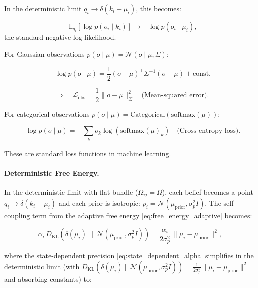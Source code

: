 \documentclass[twoside,11pt]{article}
\begin{document}
In the deterministic limit $q_i \to \delta(k_i - \mu_i)$, this becomes:

\begin{equation}
-\mathbb{E}_{q_i}[\log p(o_i \mid k_i)] \to -\log p(o_i \mid \mu_i),
\end{equation}
the standard negative log-likelihood.

For Gaussian observations $p(o \mid \mu) = \mathcal{N}(o \mid \mu, \Sigma)$:

\begin{equation}
-\log p(o \mid \mu) = \frac{1}{2}(o - \mu)^\top \Sigma^{-1} (o - \mu) + \text{const.}
\end{equation}

\begin{equation}
\implies \quad \mathcal{L}_{\text{obs}} = \frac{1}{2}\|o - \mu\|^2_{\Sigma} \quad \text{(Mean-squared error)}.
\end{equation}

For categorical observations $p(o \mid \mu) = \mathrm{Categorical}(\mathrm{softmax}(\mu))$:

\begin{equation}
-\log p(o \mid \mu) = -\sum_k o_k \log(\mathrm{softmax}(\mu)_k) \quad \text{(Cross-entropy loss)}.
\end{equation}

These are standard loss functions in machine learning. 


\paragraph{Deterministic Free Energy.}

In the deterministic limit with flat bundle ($\Omega_{ij} = \Omega$), each belief becomes a point $q_i \to \delta(k_i - \mu_i)$ and each prior is isotropic: $p_i = \mathcal{N}(\mu_{\text{prior}}, \sigma_p^2 I)$. The self-coupling term from the adaptive free energy \eqref{eq:free_energy_adaptive} becomes:

\begin{equation}
\alpha_i \,D_{\mathrm{KL}}(\delta(\mu_i) \,\|\, \mathcal{N}(\mu_{\text{prior}}, \sigma_p^2 I))
= \frac{\alpha_i}{2\sigma_p^2}\,\|\mu_i - \mu_{\text{prior}}\|^2,
\end{equation}

where the state-dependent precision \eqref{eq:state_dependent_alpha} simplifies in the deterministic limit (with $D_{\mathrm{KL}}(\delta(\mu_i) \| \mathcal{N}(\mu_{\text{prior}}, \sigma_p^2 I)) = \frac{1}{2\sigma_p^2}\|\mu_i - \mu_{\text{prior}}\|^2$ and absorbing constants) to:
\end{document}
